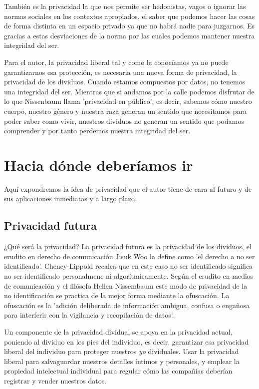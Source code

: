 \documentclass[11pt]{article}
\begin{document}
También es la privacidad la que nos permite ser hedonistas, vagos o ignorar las normas sociales en los contextos apropiados, el saber que podemos hacer las cosas de forma distinta en un espacio privado ya que no habrá nadie para juzgarnos. Es gracias a estas desviaciones de la norma por las cuales podemos mantener nuestra integridad del ser.

Para el autor, la privacidad liberal tal y como la conocíamos ya no puede garantizarnos esa protección, es necesaria una nueva forma de privacidad, la privacidad de los dividuos. Cuando estamos compuestos por datos, no tenemos una integridad del ser. Mientras que si andamos por la calle podemos disfrutar de lo que Nissenbaum llama 'privacidad en público', es decir, sabemos cómo nuestro cuerpo, nuestro género y nuestra raza generan un sentido que necesitamos para poder saber como vivir, nuestros dividuos no generan un sentido que podamos comprender y por tanto perdemos nuestra integridad del ser.
\section{Hacia dónde deberíamos ir}
Aquí expondremos la idea de privacidad que el autor tiene de cara al futuro y de sus aplicaciones inmediatas y a largo plazo.
\subsection{Privacidad futura}
¿Qué será la privacidad? La privacidad futura es la privacidad de los dividuos, el erudito en derecho de comunicación Jisuk Woo la define como 'el derecho a no ser identificado'. Cheney-Lippold recalca que en este caso no ser identificado significa no ser identificado personalmene ni algorítmicamente. Según el erudito en medios de comunicación y el filósofo Hellen Nissembaum este modo de privacidad de la no identificación se practica de la mejor forma mediante la ofuscación. La ofuscación es la 'adición deliberada de información ambigua, confusa o engañosa para interferir con la vigilancia y recopilación de datos'.

Un componente de la privacidad dividual se apoya en la privacidad actual, poniendo al dividuo en los pies del individuo, es decir, garantizar esa privacidad liberal del individuo para proteger nuestros \textit{yo} dividuales. Usar la privacidad liberal para salvaguardar nuestros detalles íntimos y personales, y emplear la propiedad intelectual individual para regular cómo las compañías deberían registrar y vender nuestros datos.
\end{document}
